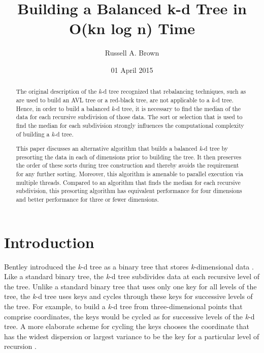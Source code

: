 \documentclass{sig-alternate}
\begin{document}
\title{Building a Balanced k-d Tree in O(kn log n) Time} 



\author{Russell A. Brown}

\date{01 April 2015}
\maketitle
\begin{abstract}

The original description of the \emph{k}-d tree recognized that rebalancing techniques, such as are used to build an AVL tree or a red-black tree, are not applicable to a \emph{k}-d tree.  Hence, in order to build a balanced \emph{k}-d tree, it is necessary to find the median of the data for each recursive subdivision of those data.  The sort or selection that is used to find the median for each subdivision strongly influences the computational complexity of building a \emph{k}-d tree.

This paper discusses an alternative algorithm that builds a balanced \emph{k}-d tree by presorting the data in each of  dimensions prior to building the tree.  It then preserves the order of these  sorts during tree construction and thereby avoids the requirement for any further sorting.  Moreover, this algorithm is amenable to parallel execution via multiple threads.  Compared to an algorithm that finds the median for each recursive subdivision, this presorting algorithm has equivalent performance for four dimensions and better performance for three or fewer dimensions.

\end{abstract}







\section{Introduction} 
\label{sec:introduction}

Bentley introduced the \emph{k}-d tree as a binary tree that stores \emph{k}-dimensional data \cite{Bentley}.  Like a standard binary tree, the \emph{k}-d tree subdivides data at each recursive level of the tree.  Unlike a standard binary tree that uses only one key for all levels of the tree, the \emph{k}-d tree uses  keys and cycles through these keys for successive levels of the tree.  For example, to build a \emph{k}-d tree from three-dimensional points that comprise  coordinates, the keys would be cycled as   for successive levels of the \emph{k}-d tree.  A more elaborate scheme for cycling the keys chooses the coordinate that has the widest dispersion or largest variance to be the key for a particular level of recursion \cite{Friedman}.
\end{document}
